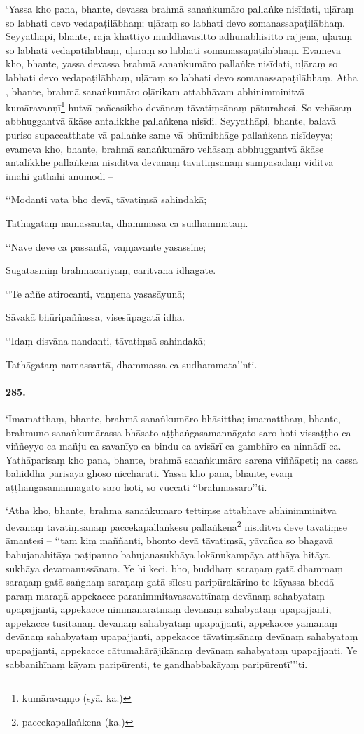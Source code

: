 ‘Yassa kho pana, bhante, devassa brahmā sanaṅkumāro pallaṅke nisīdati, uḷāraṃ so labhati devo vedapaṭilābhaṃ; uḷāraṃ so labhati devo somanassapaṭilābhaṃ. Seyyathāpi, bhante, rājā khattiyo muddhāvasitto adhunābhisitto rajjena, uḷāraṃ so labhati vedapaṭilābhaṃ, uḷāraṃ so labhati somanassapaṭilābhaṃ. Evameva kho, bhante, yassa devassa brahmā sanaṅkumāro pallaṅke nisīdati, uḷāraṃ so labhati devo vedapaṭilābhaṃ, uḷāraṃ so labhati devo somanassapaṭilābhaṃ. Atha , bhante, brahmā sanaṅkumāro oḷārikaṃ attabhāvaṃ abhinimminitvā kumāravaṇṇī\footnote{kumāravaṇṇo (syā. ka.)} hutvā pañcasikho devānaṃ tāvatiṃsānaṃ pāturahosi. So vehāsaṃ abbhuggantvā ākāse antalikkhe pallaṅkena nisīdi. Seyyathāpi, bhante, balavā puriso supaccatthate vā pallaṅke same vā bhūmibhāge pallaṅkena nisīdeyya; evameva kho, bhante, brahmā sanaṅkumāro vehāsaṃ abbhuggantvā ākāse antalikkhe pallaṅkena nisīditvā devānaṃ tāvatiṃsānaṃ sampasādaṃ viditvā imāhi gāthāhi anumodi –

‘‘Modanti vata bho devā, tāvatiṃsā sahindakā;

Tathāgataṃ namassantā, dhammassa ca sudhammataṃ.

‘‘Nave deve ca passantā, vaṇṇavante yasassine;

Sugatasmiṃ brahmacariyaṃ, caritvāna idhāgate.

‘‘Te aññe atirocanti, vaṇṇena yasasāyunā;

Sāvakā bhūripaññassa, visesūpagatā idha.

‘‘Idaṃ disvāna nandanti, tāvatiṃsā sahindakā;

Tathāgataṃ namassantā, dhammassa ca sudhammata’’nti.

\paragraph{285.} ‘Imamatthaṃ, bhante, brahmā sanaṅkumāro bhāsittha; imamatthaṃ, bhante, brahmuno sanaṅkumārassa bhāsato aṭṭhaṅgasamannāgato saro hoti vissaṭṭho ca viññeyyo ca mañju ca savanīyo ca bindu ca avisārī ca gambhīro ca ninnādī ca. Yathāparisaṃ kho pana, bhante, brahmā sanaṅkumāro sarena viññāpeti; na cassa bahiddhā parisāya ghoso niccharati. Yassa kho pana, bhante, evaṃ aṭṭhaṅgasamannāgato saro hoti, so vuccati ‘‘brahmassaro’’ti.

‘Atha kho, bhante, brahmā sanaṅkumāro tettiṃse attabhāve abhinimminitvā devānaṃ tāvatiṃsānaṃ paccekapallaṅkesu pallaṅkena\footnote{paccekapallaṅkena (ka.)} nisīditvā deve tāvatiṃse āmantesi – ‘‘taṃ kiṃ maññanti, bhonto devā tāvatiṃsā, yāvañca so bhagavā bahujanahitāya paṭipanno bahujanasukhāya lokānukampāya atthāya hitāya sukhāya devamanussānaṃ. Ye hi keci, bho, buddhaṃ saraṇaṃ gatā dhammaṃ saraṇaṃ gatā saṅghaṃ saraṇaṃ gatā sīlesu paripūrakārino te kāyassa bhedā paraṃ maraṇā appekacce paranimmitavasavattīnaṃ devānaṃ sahabyataṃ upapajjanti, appekacce nimmānaratīnaṃ devānaṃ sahabyataṃ upapajjanti, appekacce tusitānaṃ devānaṃ sahabyataṃ upapajjanti, appekacce yāmānaṃ devānaṃ sahabyataṃ upapajjanti, appekacce tāvatiṃsānaṃ devānaṃ sahabyataṃ upapajjanti, appekacce cātumahārājikānaṃ devānaṃ sahabyataṃ upapajjanti. Ye sabbanihīnaṃ kāyaṃ paripūrenti, te gandhabbakāyaṃ paripūrentī’’’ti.

